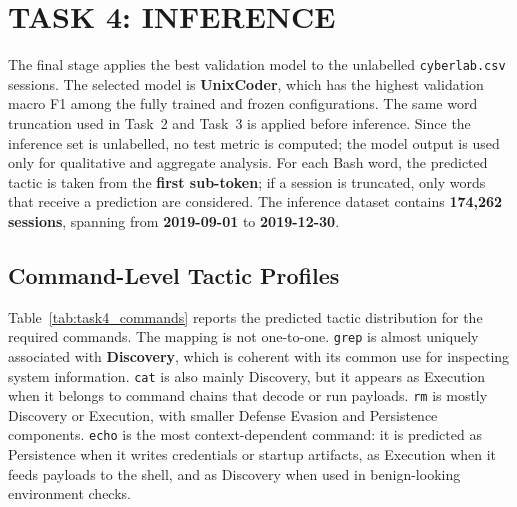 \section{TASK 4: INFERENCE} \label{sec:task4}

The final stage applies the best validation model to the unlabelled
\texttt{cyberlab.csv} sessions. The selected model is \textbf{UnixCoder}, which
has the highest validation macro F1 among the fully trained and frozen
configurations. The same word truncation used in Task~2 and Task~3 is applied
before inference. Since the inference set is unlabelled, no test metric is
computed; the model output is used only for qualitative and aggregate analysis.
For each Bash word, the predicted tactic is taken from the \textbf{first
sub-token}; if a session is truncated, only words that receive a prediction are
considered.
The inference dataset contains \textbf{174,262 sessions}, spanning from
\textbf{2019-09-01} to \textbf{2019-12-30}.

\subsection{Command-Level Tactic Profiles} \label{subsec:task4_commands}

Table~\ref{tab:task4_commands} reports the predicted tactic distribution for
the required commands. The mapping is not one-to-one. \texttt{grep} is almost
uniquely associated with \textbf{Discovery}, which is coherent with its common
use for inspecting system information. \texttt{cat} is also mainly Discovery,
but it appears as Execution when it belongs to command chains that decode or run
payloads. \texttt{rm} is mostly Discovery or Execution, with smaller Defense
Evasion and Persistence components. \texttt{echo} is the most context-dependent
command: it is predicted as Persistence when it writes credentials or startup
artifacts, as Execution when it feeds payloads to the shell, and as Discovery
when used in benign-looking environment checks.

